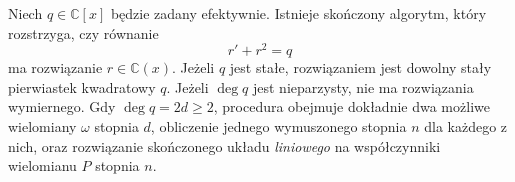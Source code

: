 \begin{twierdzenie}
\label{aa:tw:kovacic-polynomial-rational-decision}
Niech $q\in\mathbb C[x]$
będzie zadany efektywnie.
Istnieje skończony algorytm,
który rozstrzyga, czy
równanie
\begin{equation}\label{aa:eq:kovacic-poly-riccati}
 r'+r^2=q
\end{equation}
ma rozwiązanie $r\in\mathbb C(x)$.
Jeżeli $q$ jest stałe,
rozwiązaniem jest dowolny
stały pierwiastek kwadratowy $q$.
Jeżeli $\deg q$ jest nieparzysty,
nie ma rozwiązania wymiernego.
Gdy $\deg q=2d\ge2$,
procedura obejmuje dokładnie
dwa możliwe wielomiany
$\omega$ stopnia $d$,
obliczenie jednego wymuszonego
stopnia $n$ dla każdego
z nich, oraz rozwiązanie
skończonego układu
\emph{liniowego} na
współczynniki wielomianu $P$
stopnia $n$.
\end{twierdzenie}
